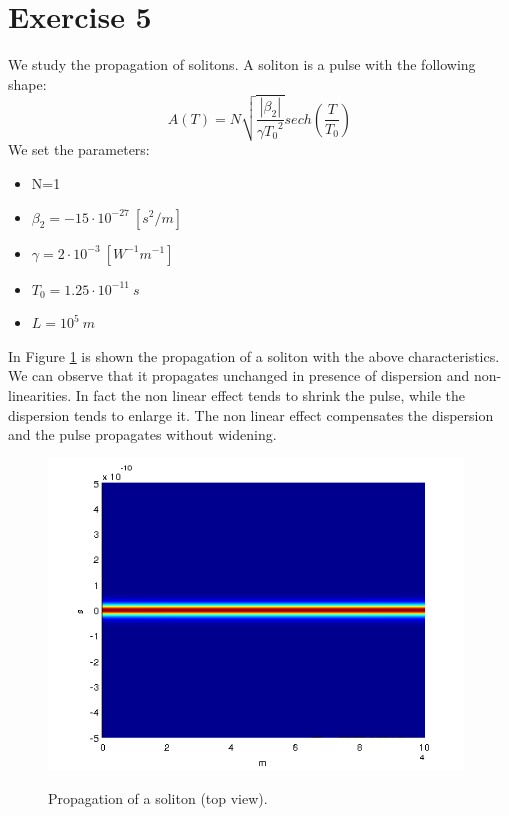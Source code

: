 \documentclass[a4paper,10pt]{report}
\begin{document}
\section*{Exercise 5}
We study the propagation of solitons. A soliton is a pulse with the following shape:
$$A(T)=N \sqrt{\frac{|\beta_2|}{\gamma {T_0}^2}} sech \left( \frac{T}{T_0}\right)$$
We set the parameters:
\begin{itemize}
 \item N=1
 \item $\beta_2 = -15 \cdot 10^{-27} \ [s^2/m]$
 \item $\gamma = 2 \cdot 10^{-3} \ [W^{-1} m^{-1}]$
 \item $T_0=1.25 \cdot 10^{-11} \ s$
 \item $L=10^5 \ m$
\end{itemize}

In Figure \ref{soliton} is shown the propagation of a soliton with the above characteristics. We can observe that it propagates unchanged
in presence of dispersion and non-linearities.
In fact the non linear effect tends to shrink the pulse, while the dispersion tends to enlarge it.
The non linear effect compensates the dispersion and the pulse propagates without widening.

\begin{figure}[!ht]
  \centering
  \includegraphics[width=11cm]{es5_soliton.png}\\
  \caption{Propagation of a soliton (top view).}
  \label{soliton}
\end{figure}
\end{document}
